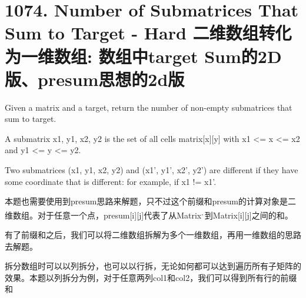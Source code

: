 \documentclass[9pt, b5paaper]{book}
\begin{document}
\section{1074. Number of Submatrices That Sum to Target - Hard 二维数组转化为一维数组:  数组中target Sum的2D版、presum思想的2d版}
\label{sec-20-2}
Given a matrix and a target, return the number of non-empty submatrices that sum to target.

A submatrix x1, y1, x2, y2 is the set of all cells matrix[x][y] with x1 <= x <= x2 and y1 <= y <= y2.

Two submatrices (x1, y1, x2, y2) and (x1', y1', x2', y2') are different if they have some coordinate that is different: for example, if x1 != x1'.

本题也需要使用到presum思路来解题，只不过这个前缀和presum的计算对象是二维数组。对于任意一个点，presum[i][j]代表了从Matrix\footnotemark[2]{}\textsuperscript{,}\,\footnotemark[2]{}到Matrix[i][j]之间的和。

有了前缀和之后，我们可以将二维数组拆解为多个一维数组，再用一维数组的思路去解题。

拆分数组时可以以列拆分，也可以以行拆，无论如何都可以达到遍历所有子矩阵的效果。本题以列拆分为例，对于任意两列col1和col2，我们可以得到所有行的前缀和
\end{document}
